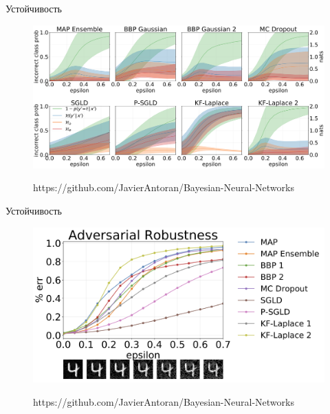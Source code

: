 \documentclass[usenames,dvipsnames,10pt,pdf,utf8,russian,aspectratio=43]{beamer}
\begin{document}
\begin{frame}{Устойчивость}
\begin{figure}
  \centering
 {\includegraphics[width=\textwidth]{rotations.png}}
\label{fig:1}\qquad
\caption*{https://github.com/JavierAntoran/Bayesian-Neural-Networks}
\end{figure}

\end{frame}



\begin{frame}{Устойчивость}
\begin{figure}
  \centering
 {\includegraphics[width=\textwidth]{kf_laplace.png}}
\label{fig:1}\qquad
\caption*{https://github.com/JavierAntoran/Bayesian-Neural-Networks}
\end{figure}

\end{frame}
\end{document}
